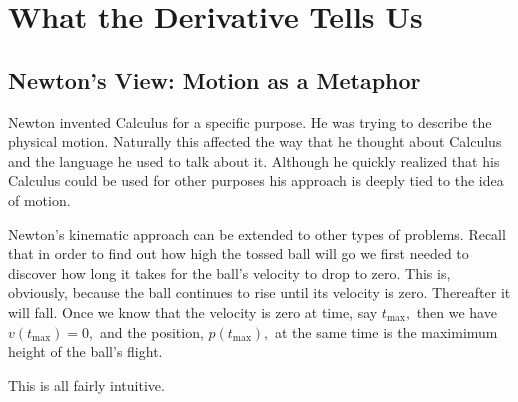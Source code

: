 
\chapter{What the Derivative Tells Us}
\label{cha:what-deriv-tells}
\section{Newton's View: Motion as a Metaphor}
\label{sec:newtons-view:-motion}


Newton invented Calculus for a specific purpose. He was trying to
describe the physical motion. Naturally this affected the way that he
thought about Calculus and the language he used to talk about
it. Although he quickly realized that his Calculus could be used for
other purposes his approach is deeply tied to the idea of motion.

Newton's kinematic approach can be extended to other types of
problems. Recall that in order to find out how high the tossed ball
will go we first needed to discover how long it takes for the ball's
velocity to drop to zero. This is, obviously, because the ball
continues to rise until its velocity is zero. Thereafter it will
fall. Once we know that the velocity is zero at time, say
$t_{\text{max}},$ then we have $v(t_{\text{max}})=0,$ and the
position, $p(t_{\text{max}}),$ at the same time is the maximimum
height of the ball's flight.

This is all fairly intuitive. 

